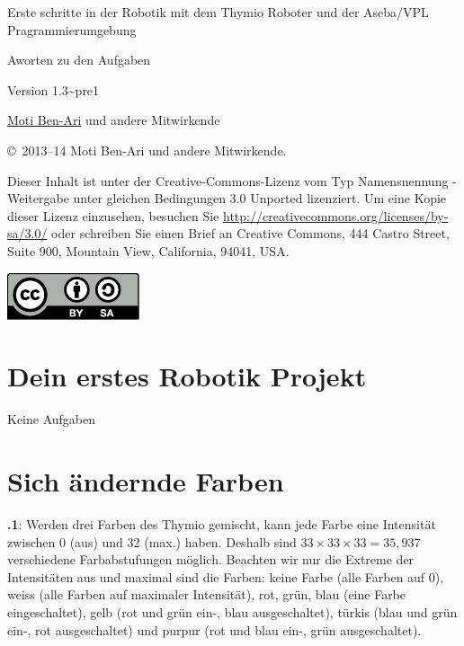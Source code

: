 \documentclass[12pt,a4paper,english]{article}
\begin{document}
\thispagestyle{empty}

\begin{center}
\begin{bfseries}

\begin{Large}
Erste schritte in der Robotik mit dem Thymio Roboter
und der Aseba/VPL Pragrammierumgebung
\bigskip

Aworten zu den Aufgaben 
\end{Large}

Version 1.3{\textasciitilde}pre1

\bigskip

\href{http://www.weizmann.ac.il/sci-tea/benari/}{Moti Ben-Ari} und andere Mitwirkende

\end{bfseries}
\end{center}

\bigskip

\copyright{}\  2013--14 Moti Ben-Ari und andere Mitwirkende.

Dieser Inhalt ist unter der Creative-Commons-Lizenz vom Typ Namensnennung -
Weitergabe unter gleichen Bedingungen 3.0 Unported lizenziert.
Um eine Kopie dieser Lizenz einzusehen, besuchen Sie \url{http://creativecommons.org/licenses/by-sa/3.0/} oder schreiben Sie einen Brief an Creative Commons, 444 Castro Street, Suite 900, Mountain View, California, 94041, USA.

\begin{center}
\hspace{6pt}\includegraphics[width=.2\textwidth]{../images/by-sa}
\end{center}

\section{Dein erstes Robotik Projekt}

Keine Aufgaben

\section{Sich ändernde Farben}

\textbf{\thesection.1}: 
Werden drei Farben des Thymio gemischt, kann jede Farbe eine Intensität zwischen 0 (aus) und 32 (max.) haben. Deshalb sind $33 \times 33 \times 33=35,937$ verschiedene Farbabstufungen möglich. Beachten wir nur die Extreme der Intensitäten aus und maximal sind die Farben: keine Farbe (alle Farben auf 0), weiss (alle Farben auf maximaler Intensität), rot, grün, blau (eine Farbe eingeschaltet), gelb (rot und grün ein-, blau ausgeschaltet), türkis (blau und grün ein-, rot ausgeschaltet) und purpur (rot und blau ein-, grün ausgeschaltet).
\end{document}

